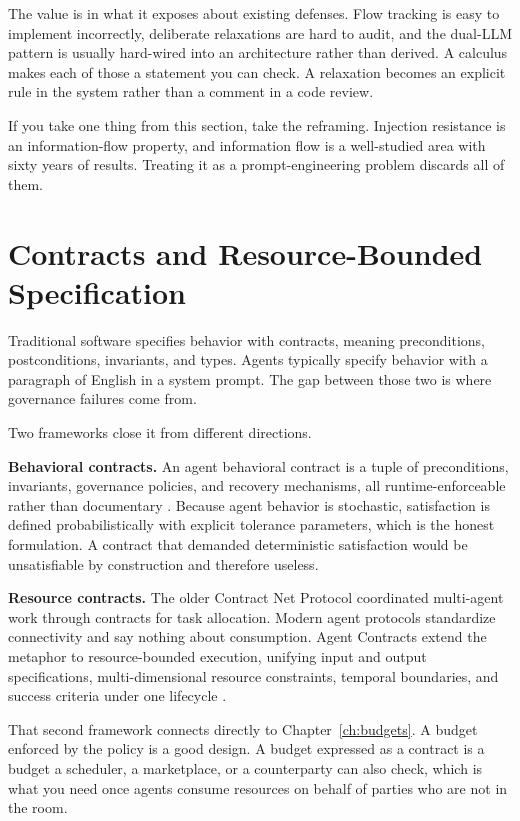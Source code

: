 The value is in what it exposes about existing defenses. Flow tracking is easy to
implement incorrectly, deliberate relaxations are hard to audit, and the dual-LLM
pattern is usually hard-wired into an architecture rather than derived. A
calculus makes each of those a statement you can check. A relaxation becomes an
explicit rule in the system rather than a comment in a code review.

If you take one thing from this section, take the reframing. Injection resistance
is an information-flow property, and information flow is a well-studied area with
sixty years of results. Treating it as a prompt-engineering problem discards all
of them.

\section{Contracts and Resource-Bounded Specification}

Traditional software specifies behavior with contracts, meaning preconditions,
postconditions, invariants, and types. Agents typically specify behavior with a
paragraph of English in a system prompt. The gap between those two is where
governance failures come from.

Two frameworks close it from different directions.

\textbf{Behavioral contracts.} An agent behavioral contract is a tuple of
preconditions, invariants, governance policies, and recovery mechanisms, all
runtime-enforceable rather than documentary \cite{agentcontracts2026}. Because
agent behavior is stochastic, satisfaction is defined probabilistically with
explicit tolerance parameters, which is the honest formulation. A contract that
demanded deterministic satisfaction would be unsatisfiable by construction and
therefore useless.

\textbf{Resource contracts.} The older Contract Net Protocol coordinated
multi-agent work through contracts for task allocation. Modern agent protocols
standardize connectivity and say nothing about consumption. Agent Contracts
extend the metaphor to resource-bounded execution, unifying input and output
specifications, multi-dimensional resource constraints, temporal boundaries, and
success criteria under one lifecycle \cite{resourcecontracts2026}.

That second framework connects directly to Chapter~\ref{ch:budgets}. A budget
enforced by the policy is a good design. A budget expressed as a contract is a
budget a scheduler, a marketplace, or a counterparty can also check, which is
what you need once agents consume resources on behalf of parties who are not in
the room.

